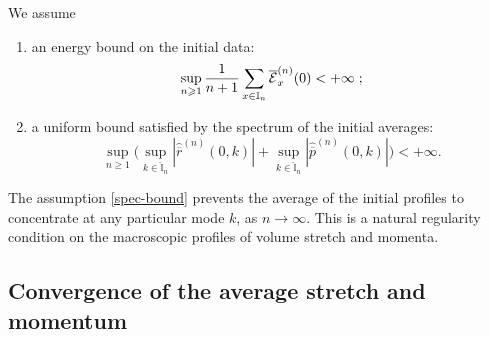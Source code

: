 \documentclass[EJP]{ejpecp} %
\newcommand\T{{\mathbb I}}
\renewcommand{\ge}{\geqslant}
\newcommand{\dd  }{\mathrm{d}}
\renewcommand{\hat}{\widehat}
\renewcommand{\bar}{\overline}
\numberwithin{equation}{section}
\begin{document}

\begin{assumption}\label{ass1} We assume 
\begin{enumerate} \item an energy bound on the initial data:
\begin{equation}
\label{E0}
\sup_{n\ge1}\frac{1}{n+1}\sum_{x\in \T_n}\bar{\cal E}_x^{(n)}(0)<+\infty \; ; 
\end{equation}
\item a uniform bound satisfied by the spectrum of the initial averages:
  \begin{equation}
\label{spec-bound}
\sup_{n\ge1}\Big(\sup_{k\in \hat \T_n}|\hat{\bar
      r}^{(n)}(0,k)|
+\sup_{k\in \hat \T_n}|\hat
{\bar p}^{(n)}(0,k)|\Big)<+\infty.
\end{equation}
\end{enumerate}\end{assumption}

{ The assumption \eqref{spec-bound} prevents the
  average of the initial profiles to
  concentrate at any particular mode $k$, as $n\to\infty$. This is a natural regularity
  condition on the macroscopic profiles of volume stretch and momenta. 
  }







\subsection{Convergence of the average stretch and momentum}

\label{sec-stretch}
\end{document}
